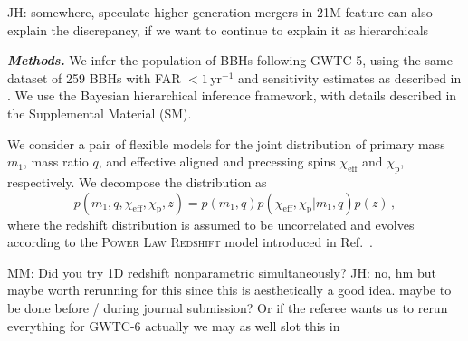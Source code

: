 \documentclass[%
    aps,
    prl,
    reprint,
    superscriptaddress,
    nolongbibliography,
    nobibnotes,
    nofootinbib,
    linenumbers,
    amsmath,amssymb,
]{revtex4-2}
\newcommand{\Msun}{\ensuremath{\mathrm{M}_{\odot}}}
\newcommand{\chieff}{\ensuremath{\chi_{\mathrm{eff}}}}
\newcommand{\chip}{\ensuremath{\chi_{\mathrm{p}}}}
\newcommand{\twoGoneG}{\ac{2G1G}\xspace}
\newcommand{\peryear}{\ensuremath{\,\mathrm{yr}^{-1}}}
\newcommand{\jh}[1]{{\color{orange}JH: #1}}
\newcommand{\mm}[1]{{\color{ForestGreen}MM: #1}}
\newcommand{\featTen}{10\xspace}
\newcommand{\featTwenty}{21\xspace}
\newcommand{\heading}[1]{\textbf{\textit{#1}}}
\begin{document}


\jh{somewhere, speculate higher generation mergers in 21M feature can also explain the discrepancy, if we want to continue to explain it as hierarchicals}

\heading{Methods.}
We infer the population of \acp{BBH} following \ac{GWTC-5},  using the same dataset of 259 \acp{BBH} with \ac{FAR} $<1\peryear$ and sensitivity estimates as described in \citet{LIGOScientific:2026ctl}. We use the Bayesian hierarchical inference framework, with details described in the Supplemental Material (SM).

We consider a pair of flexible models for the joint distribution of primary mass $m_1$, mass ratio $q$, and effective aligned and precessing spins $\chieff$ and $\chip$, respectively. We decompose the distribution as
\begin{equation}
    p(m_1, q, \chieff, \chip, z) = p(m_1, q)p(\chieff, \chip | m_1, q)p(z) \, ,
    \label{eq: spins conditional on mass basic model}
\end{equation}
where the redshift distribution is assumed to be uncorrelated and evolves according to the \textsc{Power Law Redshift} model introduced in Ref.~\cite{Fishbach:2018edt}.

\mm{Did you try 1D redshift nonparametric simultaneously?} \jh{no, hm but maybe worth rerunning for this since this is aesthetically a good idea. maybe to be done before / during journal submission? Or if the referee wants us to rerun everything for GWTC-6 actually we may as well slot this in}
\end{document}
